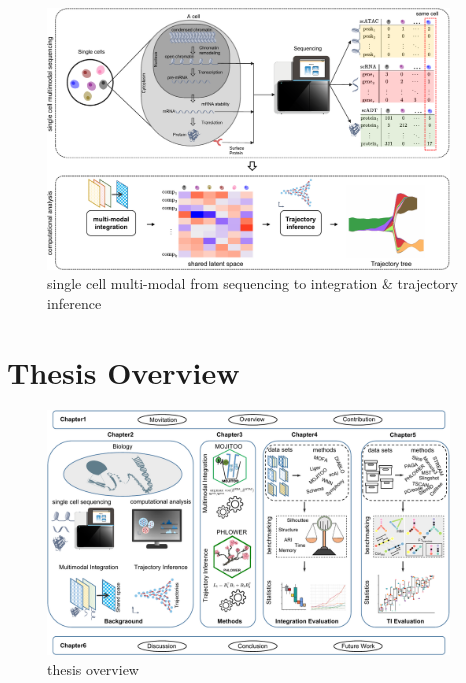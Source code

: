 \begin{figure}[!ht]
	\centering
	\includegraphics[width=0.95\textwidth]{multimodal_schematic/fig}
	\vspace{0.1cm}
	\caption[single cell multi-modal from sequencing to integration \& trajectory inference]{single cell multi-modal from sequencing to integration \& trajectory inference}
	\label{fig:sc_mulitmodal_sequencing_to_integration_ti}
\end{figure}


\section{Thesis Overview}
\label{introduction:sec2.overview}

\begin{figure}[!ht]
	\centering
	\includegraphics[width=0.95\textwidth]{thesis_overview/fig}
	\vspace{0.1cm}
	\caption[thesis overview]{thesis overview}
	\label{fig:thesis_overview}
\end{figure}



